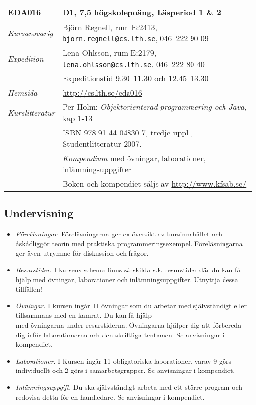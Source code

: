 \begin{longtable}[c]{@{}ll@{}}
\toprule
\textbf{EDA016} & D1, 7,5 högskolepoäng, Läsperiod 1 \& 2\tabularnewline
\midrule
\endhead
\emph{Kursansvarig} & Björn Regnell, rum E:2413,
\href{mailto:bjorn.regnell@cs.lth.se}{\nolinkurl{bjorn.regnell@cs.lth.se}},
046--222 90 09\tabularnewline
\emph{Expedition} & Lena Ohlsson, rum E:2179,
\href{mailto:lena.ohlsson@cs.lth.se}{\nolinkurl{lena.ohlsson@cs.lth.se}},
046--222 80 40\tabularnewline
& Expeditionstid 9.30--11.30 och 12.45--13.30\tabularnewline
\emph{Hemsida} & \url{http://cs.lth.se/eda016}\tabularnewline
\emph{Kurslitteratur} & Per Holm: \emph{Objektorienterad programmering
och Java}, kap 1-13\tabularnewline
& ISBN 978-91-44-04830-7, tredje uppl., Studentlitteratur
2007.\tabularnewline
& \emph{Kompendium} med övningar, laborationer,
inlämningsuppgifter\tabularnewline
& Boken och kompendiet säljs av
\url{http://www.kfsab.se/}\tabularnewline
\bottomrule
\end{longtable}

\subsection{Undervisning}\label{undervisning}

\begin{itemize}
\item
  \emph{Föreläsningar}. Föreläsningarna ger en översikt av
  kursinnehållet och åskådliggör teorin med praktiska
  programmeringsexempel. Föreläsningarna ger även utrymme för diskussion
  och frågor.
\item
  \emph{Resurstider}. I kursens schema finns särskilda s.k. resurstider
  där du kan få hjälp med övningar, laborationer och
  inlämningsuppgifter. Utnyttja dessa tillfällen!
\item
  \emph{Övningar}. I kursen ingår 11 övningar som du arbetar med
  självständigt eller tillsammans med en kamrat. Du kan få hjälp\\
  med övningarna under resurstiderna. Övningarna hjälper dig att
  förbereda dig inför laborationerna och den skriftliga tentamen. Se
  anvisningar i kompendiet.
\item
  \emph{Laborationer}. I Kursen ingår 11 obligatoriska laborationer,
  varav 9 görs individuellt och 2 görs i samarbetsgrupper. Se
  anvisningar i kompendiet.
\item
  \emph{Inlämningsuppgift}. Du ska självständigt arbeta med ett större
  program och redovisa detta för en handledare. Se anvisningar i
  kompendiet.
\end{itemize}

